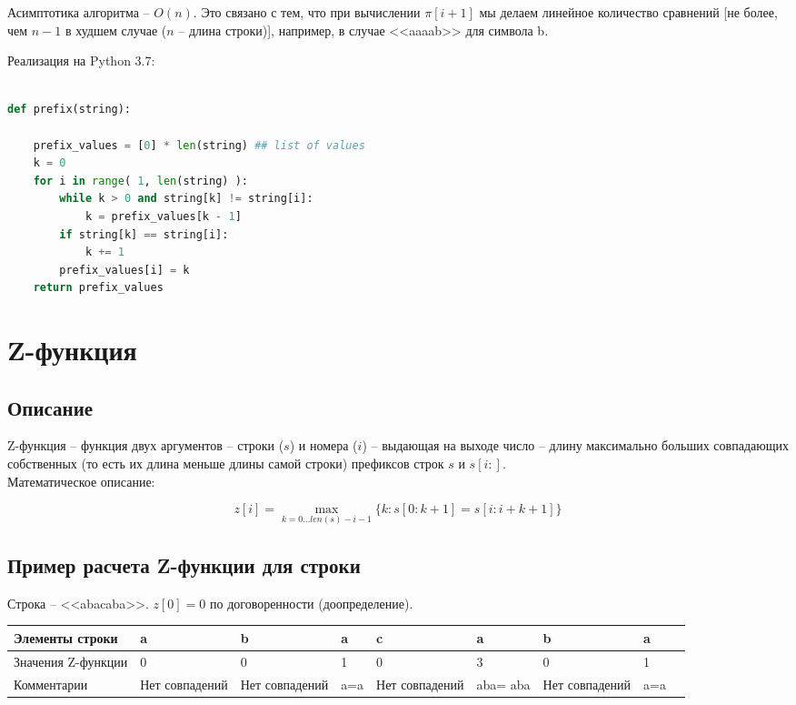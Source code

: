 \documentclass[a4paper,12pt]{article} %
\begin{document}
Асимптотика алгоритма – $O(n)$. Это связано с тем, что при вычислении $\pi[i+1]$ мы делаем линейное количество сравнений [не более, чем $n-1$ в худшем случае ($n$ – длина строки)], например, в случае <<aaaab>> для символа b.\\

\newpage

Реализация на Python 3.7:

\begin{lstlisting}[language=Python]

def prefix(string):

    prefix_values = [0] * len(string) ## list of values
    k = 0
    for i in range( 1, len(string) ):
        while k > 0 and string[k] != string[i]: 
            k = prefix_values[k - 1]
        if string[k] == string[i]: 
            k += 1            
        prefix_values[i] = k
    return prefix_values

\end{lstlisting}

\section{Z-функция}

\subsection{Описание}

Z-функция – функция двух аргументов – строки ($s$) и номера ($i$) – выдающая на выходе число – длину максимально больших совпадающих собственных (то есть их длина меньше длины самой строки) префиксов строк $s$ и $s[i : ]$.\\

Математическое описание:

\begin{equation}
z[i] = \max_{k = 0 \dots len(s)-i-1} { \lbrace k : s[0 : k+1] = s[i : i+k+1] \rbrace }
\end{equation}

\subsection{Пример расчета Z-функции для строки}

Строка – <<abacaba>>. $z[0]=0$ по договоренности (доопределение).

\begin{table}[h!]

\begin{tabular}{|p{2.5cm}||p{1.3cm}|p{1.3cm}|p{1.3cm}|p{1.3cm}|p{1.3cm}|p{1.3cm}|p{1.3cm}|p{2.5cm}|}

\hline 
Элементы строки & a & b & a & c & a & b & a \\ 
\hline 
Значения Z-функции & 0 & 0 & 1 & 0 & 3 & 0 & 1 \\ 
\hline 
Комментарии & Нет совпадений & Нет совпадений & a=a & Нет совпадений & aba= aba & Нет совпадений & a=a \\ 
\hline 
\end{tabular} 

\end{table}
\end{document}
